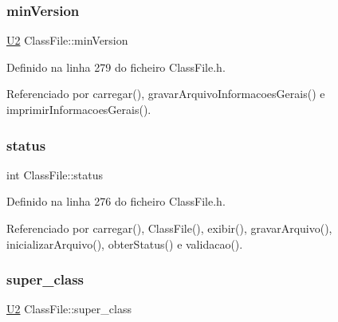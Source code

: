 \mbox{\label{classClassFile_ab0d3a4474a9907dc61893d0293525b38}} 
\subsubsection{\texorpdfstring{min\+Version}{minVersion}}
{\footnotesize\ttfamily \hyperlink{BasicTypes_8h_a90240657108b1b457eef9d3f76e0202e}{U2} Class\+File\+::min\+Version\hspace{0.3cm}{\ttfamily [private]}}



Definido na linha 279 do ficheiro Class\+File.\+h.



Referenciado por carregar(), gravar\+Arquivo\+Informacoes\+Gerais() e imprimir\+Informacoes\+Gerais().

\mbox{\label{classClassFile_a9afeae9ac0889ab75909e73933e29326}} 
\subsubsection{\texorpdfstring{status}{status}}
{\footnotesize\ttfamily int Class\+File\+::status\hspace{0.3cm}{\ttfamily [private]}}



Definido na linha 276 do ficheiro Class\+File.\+h.



Referenciado por carregar(), Class\+File(), exibir(), gravar\+Arquivo(), inicializar\+Arquivo(), obter\+Status() e validacao().

\mbox{\label{classClassFile_ad92079216f8cdb366a3002e5ca2c2dfa}} 
\subsubsection{\texorpdfstring{super\+\_\+class}{super\_class}}
{\footnotesize\ttfamily \hyperlink{BasicTypes_8h_a90240657108b1b457eef9d3f76e0202e}{U2} Class\+File\+::super\+\_\+class\hspace{0.3cm}{\ttfamily [private]}}



